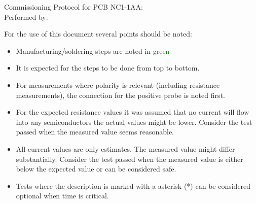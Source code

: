 \begin{Form}[]
\fontsize{25pt}{20}\selectfont Commissioning Protocol for PCB NC1-1AA: \TextField[name=Title, bordercolor = black, borderstyle = U]{}\\

Performed by: \TextField[name=Name, bordercolor = black, borderstyle = U]{}
\end{Form}

\vspace{6cm}

For the use of this document several points should be noted:

\begin{itemize}
\item Manufacturing/soldering steps are noted in \textcolor{green}{green}
\item It is expected for the steps to be done from top to bottom.
\item For measurements where polarity is relevant (including resistance measurements), the connection for the positive probe is noted first.
\item For the expected resistance values it was assumed that no current will flow into any semiconductors the actual values might be lower. Consider the test passed when the measured value seems reasonable.
\item All current values are only estimates. The measured value might differ substantially. Consider the test passed when the measured value is either below the expected value or can  be considered safe.
\item Tests where the description is marked with a asterisk (*) can be considered optional when time is critical.



\end{itemize}

